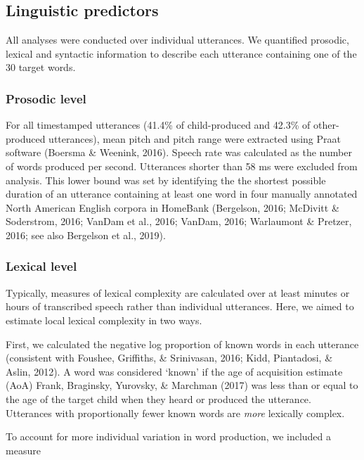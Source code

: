 \documentclass[10pt, letterpaper]{article}
\begin{document}
\hypertarget{linguistic-predictors}{%
\subsection{Linguistic predictors}\label{linguistic-predictors}}

All analyses were conducted over individual utterances. We quantified
prosodic, lexical and syntactic information to describe each utterance
containing one of the 30 target words.

\hypertarget{prosodic-level}{%
\subsubsection{Prosodic level}\label{prosodic-level}}

For all timestamped utterances (41.4\% of child-produced and 42.3\% of
other-produced utterances), mean pitch and pitch range were extracted
using Praat software (Boersma \& Weenink, 2016). Speech rate was
calculated as the number of words produced per second. Utterances
shorter than 58 ms were excluded from analysis. This lower bound was set
by identifying the the shortest possible duration of an utterance
containing at least one word in four manually annotated North American
English corpora in HomeBank (Bergelson, 2016; McDivitt \& Soderstrom,
2016; VanDam et al., 2016; VanDam, 2016; Warlaumont \& Pretzer, 2016;
see also Bergelson et al., 2019).

\hypertarget{lexical-level}{%
\subsubsection{Lexical level}\label{lexical-level}}

Typically, measures of lexical complexity are calculated over at least
minutes or hours of transcribed speech rather than individual
utterances. Here, we aimed to estimate local lexical complexity in two
ways.

First, we calculated the negative log proportion of known words in each
utterance (consistent with Foushee, Griffiths, \& Srinivasan, 2016;
Kidd, Piantadosi, \& Aslin, 2012). A word was considered `known' if the
age of acquisition estimate (AoA) Frank, Braginsky, Yurovsky, \&
Marchman (2017) was less than or equal to the age of the target child
when they heard or produced the utterance. Utterances with
proportionally fewer known words are \emph{more} lexically complex.

To account for more individual variation in word production, we included
a measure
\end{document}
